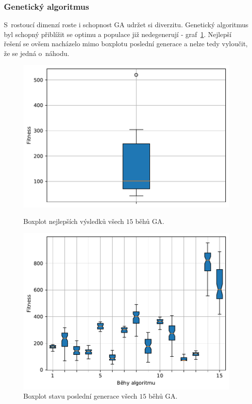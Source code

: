\subsubsection{Genetický algoritmus}
S~rostoucí dimenzí roste i schopnost GA udržet si diverzitu. Genetický algoritmus byl schopný přiblížit se optimu a populace již nedegenerují - graf~\ref{fg:hifu:blob:ga:lastGen}. Nejlepší řešení se ovšem nacházelo mimo  boxplotu poslední generace a nelze tedy vyloučit, že se jedná o~náhodu.
\begin{figure}[H]
\begin{minipage}[t]{0.475\linewidth}
\includegraphics[width=\linewidth]{obrazky-figures/statistics/HIFU/blob/20/GA/bestsBoxplot_WithOutliers.pdf}
\caption{Boxplot nejlepších výsledků všech $15$ běhů GA.}
\label{fg:hifu:blob:ga:best}
\end{minipage}
\hfill
\begin{minipage}[t]{0.475\linewidth}
\includegraphics[width=\linewidth]{obrazky-figures/statistics/HIFU/blob/20/GA/lastGenBoxplots.pdf}
\caption{Boxplot stavu poslední generace všech $15$ běhů GA.}
\label{fg:hifu:blob:ga:lastGen}
\end{minipage}
\end{figure}


